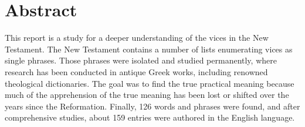 \section*{Abstract}

This report is a study for a deeper understanding of the vices in the New Testament. The New Testament contains a number of lists enumerating vices as single phrases. Those phrases were isolated and studied permanently, where research has been conducted in antique Greek works, including renowned theological dictionaries. The goal was to find the true practical meaning because much of the apprehension of the true meaning has been lost or shifted over the years since the Reformation. Finally, 126 words and phrases were found, and after comprehensive studies, about 159 entries were authored in the English language.

